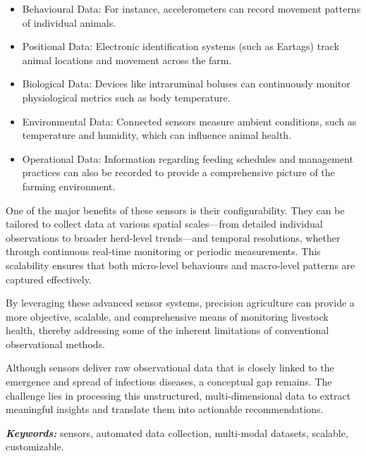 \begin{itemize}
    \item Behavioural Data: For instance, accelerometers can record movement patterns of individual animals.
    \item Positional Data: Electronic identification systems (such as Eartags) track animal locations and movement across the farm.
    \item Biological Data: Devices like intraruminal boluses can continuously monitor physiological metrics such as body temperature.
    \item Environmental Data: Connected sensors measure ambient conditions, such as temperature and humidity, which can influence animal health.
    \item Operational Data: Information regarding feeding schedules and management practices can also be recorded to provide a comprehensive picture of the farming environment.
\end{itemize}

One of the major benefits of these sensors is their configurability. They can be tailored to collect data at various spatial scales—from detailed individual observations to broader herd-level trends—and temporal resolutions, whether through continuous real-time monitoring or periodic measurements. This scalability ensures that both micro-level behaviours and macro-level patterns are captured effectively. 

By leveraging these advanced sensor systems, precision agriculture can provide a more objective, scalable, and comprehensive means of monitoring livestock health, thereby addressing some of the inherent limitations of conventional observational methods.

Although sensors deliver raw observational data that is closely linked to the emergence and spread of infectious diseases, a conceptual gap remains. The challenge lies in processing this unstructured, multi-dimensional data to extract meaningful insights and translate them into actionable recommendations.

\textit{\textbf{Keywords:}} sensors, automated data collection, multi-modal datasets, scalable, customizable.


